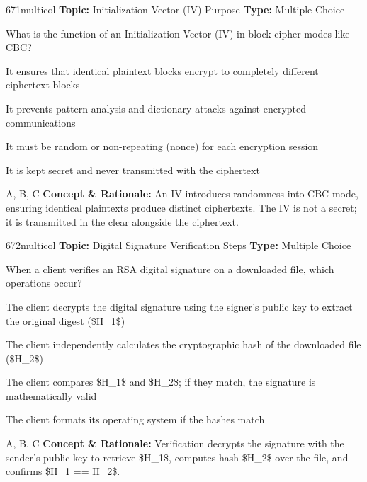 \begin{qcard}{671}{multicol}
\textcolor{darkslate!75}{\small\textbf{Topic:} Initialization Vector (IV) Purpose \hfill \textbf{Type:} Multiple Choice}\vspace{0.4em}\par
What is the function of an Initialization Vector (IV) in block cipher modes like CBC?
\begin{qoptions}
\item It ensures that identical plaintext blocks encrypt to completely different ciphertext blocks
\item It prevents pattern analysis and dictionary attacks against encrypted communications
\item It must be random or non-repeating (nonce) for each encryption session
\item It is kept secret and never transmitted with the ciphertext
\end{qoptions}
\end{qcard}
\nopagebreak
\begin{explainbox}{A, B, C}
\textbf{Concept \& Rationale:} An IV introduces randomness into CBC mode, ensuring identical plaintexts produce distinct ciphertexts. The IV is not a secret; it is transmitted in the clear alongside the ciphertext.
\end{explainbox}

\begin{qcard}{672}{multicol}
\textcolor{darkslate!75}{\small\textbf{Topic:} Digital Signature Verification Steps \hfill \textbf{Type:} Multiple Choice}\vspace{0.4em}\par
When a client verifies an RSA digital signature on a downloaded file, which operations occur?
\begin{qoptions}
\item The client decrypts the digital signature using the signer's public key to extract the original digest (\$H\_1\$)
\item The client independently calculates the cryptographic hash of the downloaded file (\$H\_2\$)
\item The client compares \$H\_1\$ and \$H\_2\$; if they match, the signature is mathematically valid
\item The client formats its operating system if the hashes match
\end{qoptions}
\end{qcard}
\nopagebreak
\begin{explainbox}{A, B, C}
\textbf{Concept \& Rationale:} Verification decrypts the signature with the sender's public key to retrieve \$H\_1\$, computes hash \$H\_2\$ over the file, and confirms \$H\_1 == H\_2\$.
\end{explainbox}

